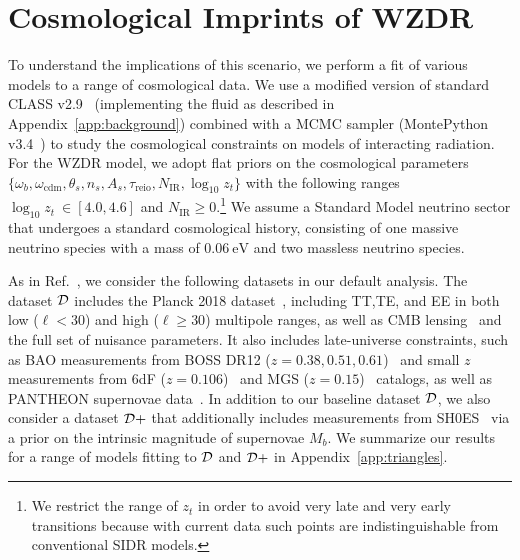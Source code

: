 \documentclass[aps,prd,twocolumn,nofootinbib,superscriptaddress]{revtex4}
\newcommand{\eV}{\text{eV}}
\newcommand{\D}{\cal{D}}
\newcommand{\App}[1]{Appendix~\ref{app:#1}}
\newcommand{\nir}{N_\text{IR}}
\newcommand{\zt}{z_t}
\begin{document}
\section{Cosmological Imprints of WZDR}
\label{sec:data}
To understand the implications of this scenario, we perform a fit of various models to a range of cosmological data. We use a modified version of standard CLASS v2.9~\cite{CLASS} (implementing the fluid as described in \App{background}) combined with a MCMC sampler (MontePython v3.4~\cite{Brinckmann:MP}) to study the cosmological constraints on models of interacting radiation. For the WZDR model, we adopt flat priors on the cosmological parameters $ \{\omega_b,\omega_\mathrm{cdm}, \theta_s, n_s,A_s, \tau_\mathrm{reio},\nir, \log_{10} z_t \}$ with the following ranges $\log_{10} \zt \ \in [4.0, 4.6]$ and $ \nir \geq 0$.\footnote{We restrict the range of $z_t$ in order to avoid very late and very early transitions because with current data such points are indistinguishable from conventional SIDR models.} We assume a Standard Model neutrino sector that undergoes a standard cosmological history, consisting of one massive neutrino species with a mass of $0.06 \ \eV$ and two massless neutrino species.

As in Ref.~\cite{Schoneberg:2021qvd}, we consider the following datasets in our default analysis. The dataset $\D$ includes the Planck 2018 dataset~\cite{Planck:2018vyg}, including TT,TE, and EE in both low ($\ell < 30$) and high ($\ell \geq 30$) multipole ranges, as well as CMB lensing~\cite{Planck:2018vyg} and the full set of nuisance parameters. It also includes late-universe constraints, such as BAO measurements from BOSS DR12 ($z=0.38,0.51,0.61$)~\cite{BOSS} and small $z$ measurements from 6dF ($z=0.106$)~\cite{6dF} and MGS ($z=0.15$)~\cite{MGS} catalogs, as well as  PANTHEON supernovae data~\cite{Scolnic:2017caz}. In addition to our baseline dataset $\cal D$, we also consider a dataset $\cal D+$ that additionally includes measurements from SH0ES~\cite{Riess:2020fzl} via a prior on the intrinsic magnitude of supernovae $M_b$. We summarize our results for a range of models fitting to $\cal D$ and $\cal D+$ in \App{triangles}.
\end{document}
